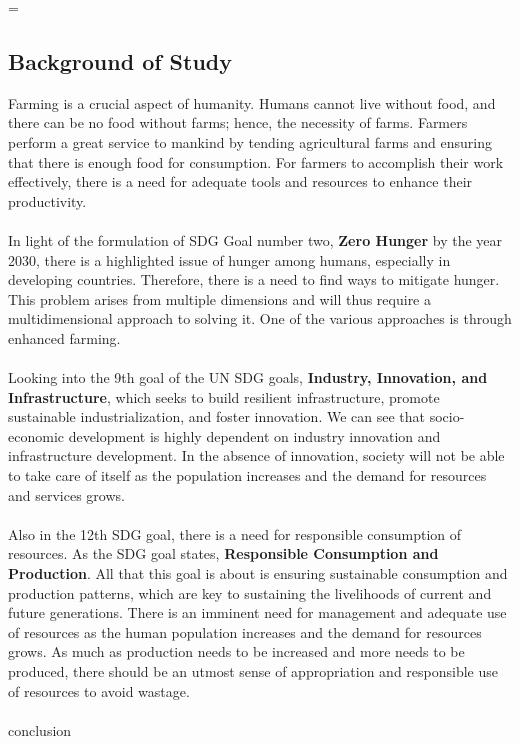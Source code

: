 =\documentclass[12pt, a4paper]{article}
\begin{document}
\subsection{Background of Study}
Farming is a crucial aspect of humanity. Humans cannot live without food, and there can be no food without farms; hence, the necessity of farms. Farmers perform a great service to mankind by tending agricultural farms and ensuring that there is enough food for consumption. For farmers to accomplish their work effectively, there is a need for adequate tools and resources to enhance their productivity.\\
\\
In light of the formulation of SDG Goal number two, \textbf{Zero Hunger} by the year 2030\cite{unhunger}, there is a highlighted issue of hunger among humans, especially in developing countries. Therefore, there is a need to find ways to mitigate hunger. This problem arises from multiple dimensions and will thus require a multidimensional approach to solving it. One of the various approaches is through enhanced farming.\\
\\
Looking into the 9th goal of the UN SDG goals, \textbf{Industry, Innovation, and Infrastructure}, which seeks to build resilient infrastructure, promote sustainable industrialization, and foster innovation\cite{uninnovation}. We can see that socio-economic development is highly dependent on industry innovation and infrastructure development. In the absence of innovation, society will not be able to take care of itself as the population increases and the demand for resources and services grows.\\
\\
Also in the 12th SDG goal, there is a need for responsible consumption of resources. As the SDG goal states, \textbf{Responsible Consumption and Production}. All that this goal is about is ensuring sustainable consumption and production patterns, which are key to sustaining the livelihoods of current and future generations\cite{unresponsible}. There is an imminent need for management and adequate use of resources as the human population increases and the demand for resources grows. As much as production needs to be increased and more needs to be produced, there should be an utmost sense of appropriation and responsible use of resources to avoid wastage.\\
\\
conclusion
\newpage
\end{document}
